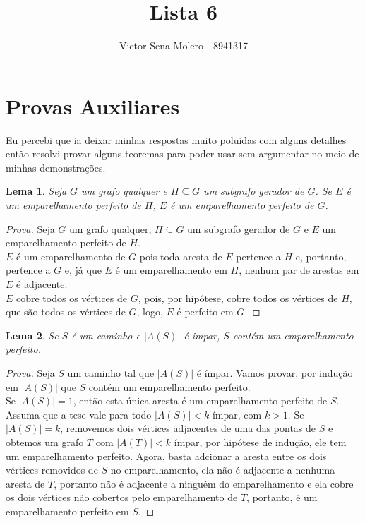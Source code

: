 \documentclass[12pt]{article}
\newtheorem{lema}{Lema}
\begin{document}
 
 
\title{Lista 6}
\author{Victor Sena Molero - 8941317}
\maketitle

\section{Provas Auxiliares}
Eu percebi que ia deixar minhas respostas muito poluídas com alguns detalhes então resolvi provar alguns teoremas para poder usar sem argumentar no meio de minhas demonstrações.

\begin{lema}
Seja $G$ um grafo qualquer e $H \subseteq G$ um subgrafo gerador de $G$. Se $E$ é um emparelhamento perfeito de $H$, $E$ é um emparelhamento perfeito de $G$.
\end{lema}

\begin{proof}[Prova]
Seja $G$ um grafo qualquer, $H \subseteq G$ um subgrafo gerador de $G$ e $E$ um emparelhamento perfeito de $H$. \\
$E$ é um emparelhamento de $G$ pois toda aresta de $E$ pertence a $H$ e, portanto, pertence a $G$ e, já que $E$ é um emparelhamento em $H$, nenhum par de arestas em $E$ é adjacente. \\
$E$ cobre todos os vértices de $G$, pois, por hipótese, cobre todos os vértices de $H$, que são todos os vértices de $G$, logo, $E$ é perfeito em $G$.
\end{proof}

\begin{lema}
Se $S$ é um caminho e $|A(S)|$ é impar, $S$ contém um emparelhamento perfeito.
\end{lema}
\begin{proof}[Prova]
Seja $S$ um caminho tal que $|A(S)|$ é ímpar. Vamos provar, por indução em $|A(S)|$ que $S$ contém um emparelhamento perfeito. \\
Se $|A(S)| = 1$, então esta única aresta é um emparelhamento perfeito de $S$. \\
Assuma que a tese vale para todo $|A(S)| < k$ ímpar, com $k > 1$.
Se $|A(S)| = k$, removemos dois vértices adjacentes de uma das pontas de $S$ e obtemos um grafo $T$ com $|A(T)| < k$ ímpar, por hipótese de indução, ele tem um emparelhamento perfeito. Agora, basta adcionar a aresta entre os dois vértices removidos de $S$ no emparelhamento, ela não é adjacente a nenhuma aresta de $T$, portanto não é adjacente a ninguém do emparelhamento e ela cobre os dois vértices não cobertos pelo emparelhamento de $T$, portanto, é um emparelhamento perfeito em $S$.
\end{proof}
\end{document}
